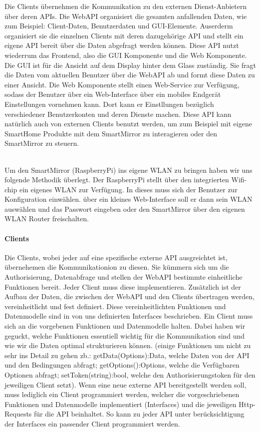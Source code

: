 Die Clients übernehmen die Kommunikation zu den externen Dienst-Anbietern über deren APIs. Die WebAPI organisiert die gesamten anfallenden Daten, wie zum Beispiel: Client-Daten, Benutzerdaten und GUI-Elemente. Auserderm organisiert sie die einzelnen Clients mit deren dazugehörige API und stellt ein eigene API bereit über die Daten abgefragt werden können. Diese API nutzt wiederrum das Frontend, also die GUI Komponente und die Web Komponente. Die GUI ist für die Ansicht auf dem Display hinter dem Glass zuständig. Sie fragt die Daten vom aktuellen Benutzer über die WebAPI ab und formt diese Daten zu einer Ansicht. Die Web Komponente stellt einen Web-Service zur Verfügung, sodass der Benutzer über ein Web-Interface über ein mobiles Endgerät Einstellungen vornehmen kann. Dort kann er Einstllungen bezüglich verschiedener Benutzerkonten und deren Dienste machen. Diese API kann natürlich auch von externen Clients benutzt werden, um zum Beispiel mit eigene SmartHome Produkte mit dem SmartMirror zu interagieren oder den SmartMirror zu steuern.\\\

Um den SmartMirror (RaspberryPi) ins eigene WLAN zu bringen haben wir uns folgende Methodik überlegt. Der RaspberryPi stellt über den integrierten Wifi-chip ein eigenes WLAN zur Verfügung. In dieses muss sich der Benutzer zur Konfiguration einwählen. über ein kleines Web-Interface soll er dann sein WLAN auswählen und das Passwort eingeben oder den SmartMirror über den eigenen WLAN Router freischalten.

\paragraph{Clients}
Die Clients, wobei jeder auf eine spezifische externe API ausgreichtet ist, übernehemen die Kommunikationion zu diesen. Sie kümmern sich um die Authorisierung, Datenabfrage und stellen der WebAPI bestimmte einheitliche Funktionen bereit. Jeder Client muss diese implementieren. Zusätzlich ist der Aufbau der Daten, die zwischen der WebAPI und den Clients übertragen werden, vereinheitlicht und fest definiert. Diese vereinheitlichten Funktionen und Datenmodelle sind in von uns definierten Interfaces beschrieben. Ein Client muss sich an die vorgebenen Funktionen und Datenmodelle halten. Dabei haben wir geguckt, welche Funktionen essentiell wichtig für die Kommunikation sind und wie wir die Daten optimal strukturieren können. (einige Funktionen um nicht zu sehr ins Detail zu gehen zb.: getData(Options):Data, welche Daten von der API und den Bedingungen abfragt; getOptions():Options, welche die Verfügbaren Optionen abfragt; setToken(string):bool, welche den Authorisierungstoken für den jeweiligen Client setzt). Wenn eine neue externe API bereitgestellt werden soll, muss lediglich ein Client programmiert werden, welcher die vorgeschriebenen Funktionen und Datenmodelle implementiert (Interfaces) und die jeweiligen Http-Requests für die API beinhaltet. So kann zu jeder API unter berücksichtigung der Interfaces ein passender Client programmiert werden.\\\
